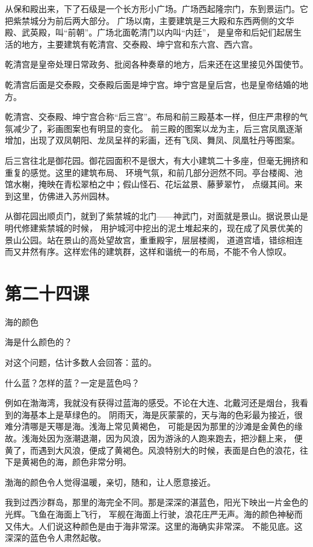 \documentclass[12pt,UTF8]{ctexbook}
\begin{document}
从保和殿出来，下了石级是一个长方形小广场。广场西起隆宗门，东到景运门。它把紫禁城分为前后两大部分。
广场以南，主要建筑是三大殿和东西两侧的文华殿、武英殿，叫“前朝”。广场北面乾清门以内叫“内廷”，
是皇帝和后妃们起居生活的地方，主要建筑有乾清宫、交泰殿、坤宁宫和东六宫、西六宫。

乾清宫是皇帝处理日常政务、批阅各种奏章的地方，后来还在这里接见外国使节。

乾清宫后面是交泰殿，交泰殿后面是坤宁宫。坤宁宫是皇后宫，也是皇帝结婚的地方。

乾清宫、交泰殿、坤宁宫合称“后三宫”。布局和前三殿基本一样，但庄严肃穆的气氛减少了，彩画图案也有明显的变化。
前三殿的图案以龙为主，后三宫凤凰逐渐增加，出现了双凤朝阳、龙凤呈祥的彩画，还有飞凤、舞凤、凤凰牡丹等图案。

后三宫往北是御花园。御花园面积不是很大，有大小建筑二十多座，但毫无拥挤和重复的感觉。这里的建筑布局、
环境气氛，和前几部分迥然不同。亭台楼阁、池馆水榭，掩映在青松翠柏之中；假山怪石、花坛盆景、藤萝翠竹，
点缀其间。来到这里，仿佛进入苏州园林。

从御花园出顺贞门，就到了紫禁城的北门——神武门，对面就是景山。据说景山是明代修建紫禁城的时候，
用护城河中挖出的泥土堆起来的，现在成了风景优美的景山公园。站在景山的高处望故宫，重重殿宇，层层楼阁，
道道宫墙，错综相连而又井然有序。这样宏伟的建筑群，这样和谐统一的布局，不能不令人惊叹。

\section{第二十四课}

海的颜色

海是什么颜色的？

对这个问题，估计多数人会回答：蓝的。

什么蓝？怎样的蓝？一定是蓝色吗？

例如在渤海湾，我就没有获得过蓝海的感受。不论在大连、北戴河还是烟台，我看到的海基本上是草绿色的。
阴雨天，海是灰蒙蒙的，天与海的色彩最为接近，很难分清哪是天哪是海。浅海上常见黄褐色，
可能是因为那里的沙滩是金黄色的缘故。浅海处因为涨潮退潮，因为风浪，因为游泳的人跑来跑去，把沙翻上来，
便黄了，而遇到大风浪，便成了黄褐色。风浪特别大的时候，表面是白色的浪花，往下是黄褐色的海，颜色非常分明。

渤海的颜色令人觉得温暖，亲切，随和，让人愿意接近。

我到过西沙群岛，那里的海完全不同。那是深深的湛蓝色，阳光下映出一片金色的光辉。飞鱼在海面上飞行，
军舰在海面上行驶，浪花庄严无声。海的颜色神秘而又伟大。人们说这种颜色是由于海非常深。这里的海确实非常深。
不能见底。这深深的蓝色令人肃然起敬。
\end{document}
